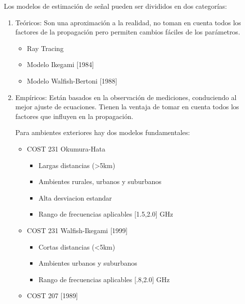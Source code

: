 Los modelos de estimación de señal pueden ser divididos en dos categorías:
\begin{enumerate}
    \item Teóricos: Son una aproximación a la realidad, no toman en cuenta todos los factores de la propagación pero permiten cambios fáciles de los parámetros. 
    \begin{itemize}
        \item Ray Tracing
        \item Modelo Ikegami [1984]
        \item Modelo Walfish-Bertoni [1988]
    \end{itemize}
    \item Empíricos: Están basados en la observación de mediciones, conduciendo al mejor ajuste de ecuaciones. Tienen la ventaja de tomar en cuenta todos los factores que influyen en la propagación.\newline
    
    Para ambientes exteriores hay dos modelos fundamentales:
    \begin{itemize}
        \item COST 231 Okumura-Hata
        \begin{itemize}
            \item Largas distancias (>5km)
            \item Ambientes rurales, urbanos y suburbanos
            \item Alta desviacion estandar
            \item Rango de frecuencias aplicables [1.5,2.0] GHz
        \end{itemize}
        \item COST 231 Walfish-Ikegami [1999]
        \begin{itemize}
            \item Cortas distancias (<5km)
            \item Ambientes urbanos y suburbanos
            \item Rango de frecuencias aplicables [.8,2.0] GHz
        \end{itemize}
        \item COST 207 [1989]
    \end{itemize}
\end{enumerate}




